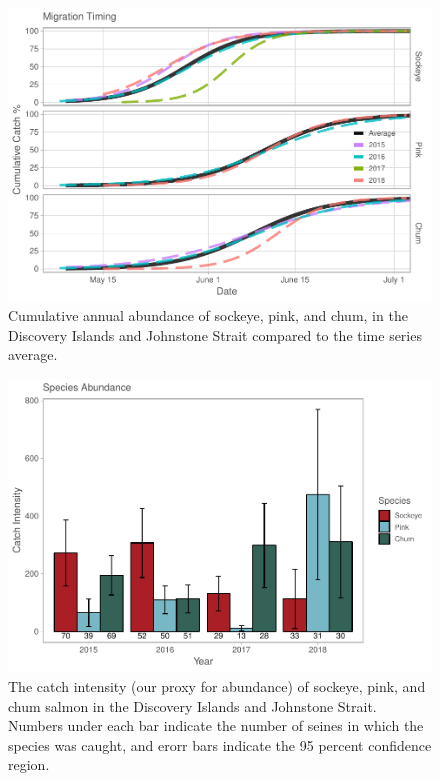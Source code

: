 \documentclass[fleqn,10pt]{wlpeerj} %
\begin{document}
\begin{figure}[H]
\includegraphics[width=0.9\linewidth]{Migration_Observations_Report_files/figure-latex/migration-timing-plot-1} \caption{Cumulative annual abundance of sockeye, pink, and chum, in the Discovery Islands and Johnstone Strait compared to the time series average.}\label{fig:migration-timing-plot}
\end{figure}

\begin{figure}[H]
\includegraphics[width=0.9\linewidth]{Migration_Observations_Report_files/figure-latex/catch-intensity-plot-1} \caption{The catch intensity (our proxy for abundance) of sockeye, pink, and chum salmon in the Discovery Islands and Johnstone Strait. Numbers under each bar indicate the number of seines in which the species was caught, and erorr bars indicate the 95 percent confidence region.}\label{fig:catch-intensity-plot}
\end{figure}
\end{document}
